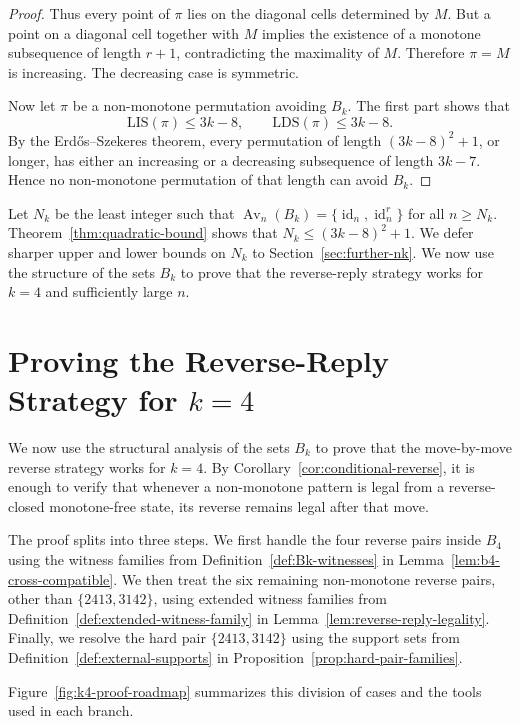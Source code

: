 \documentclass[11pt]{amsart}
\newcommand{\Av}{\operatorname{Av}}
\newcommand{\id}{\operatorname{id}}
\theoremstyle{plain}
\theoremstyle{definition}
\theoremstyle{remark}
\begin{document}
\begin{proof}
  Thus every point of $\pi$ lies on the diagonal cells determined by $M$.  But a point on a diagonal
  cell together with $M$ implies the existence of a monotone subsequence of length $r+1$,
  contradicting the maximality of $M$.  Therefore $\pi=M$ is increasing.  The
  decreasing case is symmetric.

  Now let $\pi$ be a non-monotone permutation avoiding $B_k$.  The first part shows that
  \[
    \mathrm{LIS}(\pi)\leq 3k-8,\qquad \mathrm{LDS}(\pi)\leq 3k-8.
  \]
  By the Erd\H{o}s--Szekeres theorem, every permutation of length $(3k-8)^2+1$, or longer, has either an
  increasing or a decreasing subsequence of length $3k-7$.  Hence no non-monotone permutation of that
  length can avoid $B_k$.
\end{proof}

Let $N_k$ be the least integer such that $\Av_n(B_k)=\{\id_n,\id_n^r\}$ for all $n \geq N_k$.
Theorem~\ref{thm:quadratic-bound} shows that $N_k \leq (3k-8)^2+1$.
We defer sharper upper and lower bounds on $N_k$ to Section~\ref{sec:further-nk}.  We now use the
structure of the sets $B_k$ to prove that the reverse-reply strategy works for $k=4$ and sufficiently large $n$.

\section{Proving the Reverse-Reply Strategy for \texorpdfstring{$k=4$}{k=4}}

We now use the structural analysis of the sets $B_k$ to prove that the move-by-move reverse
strategy works for $k=4$.  By Corollary~\ref{cor:conditional-reverse}, it is enough to verify that
whenever a non-monotone pattern is legal from a reverse-closed monotone-free state, its reverse
remains legal after that move.

The proof splits into three steps.  We first handle the four reverse pairs inside $B_4$ using the
witness families from Definition~\ref{def:Bk-witnesses} in Lemma~\ref{lem:b4-cross-compatible}.
We then treat the six remaining non-monotone reverse pairs,
other than $\{2413,3142\}$, using extended witness families from Definition~\ref{def:extended-witness-family}
in Lemma~\ref{lem:reverse-reply-legality}.
Finally, we resolve the hard pair $\{2413,3142\}$ using the support sets from Definition~\ref{def:external-supports}
in Proposition~\ref{prop:hard-pair-families}.

Figure~\ref{fig:k4-proof-roadmap} summarizes this division of cases and the tools used in each branch.
\end{document}
